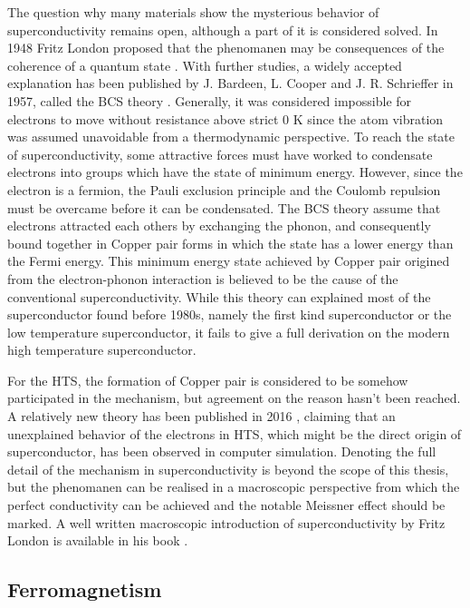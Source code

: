 The question why many materials show the mysterious behavior of superconductivity remains open, although a part of it is considered solved.
In 1948 Fritz London proposed that the phenomanen may be consequences of the coherence of a quantum state \cite{2_10}.
With further studies, a widely accepted explanation has been published by J. Bardeen, L. Cooper and J. R. Schrieffer in 1957, called the BCS theory \cite{2_11}.
Generally, it was considered impossible for electrons to move without resistance above strict 0 K since the atom vibration was assumed unavoidable from a thermodynamic perspective.
To reach the state of superconductivity, some attractive forces must have worked to condensate electrons into groups which have the state of minimum energy.
However, since the electron is a fermion, the Pauli exclusion principle and the Coulomb repulsion must be overcame before it can be condensated.
The BCS theory assume that electrons attracted each others by exchanging the phonon, and consequently bound together in Copper pair forms in which the state has a lower energy than the Fermi energy.
This minimum energy state achieved by Copper pair origined from the electron-phonon interaction is believed to be the cause of the conventional superconductivity.
While this theory can explained most of the superconductor found before 1980s, namely the first kind superconductor or the low temperature superconductor,
it fails to give a full derivation on the modern high temperature superconductor.

For the HTS, the formation of Copper pair is considered to be somehow participated in the mechanism, but agreement on the reason hasn't been reached.
A relatively new theory has been published in 2016 \cite{2_12}, claiming that an unexplained behavior of the electrons in HTS,
which might be the direct origin of superconductor, has been observed in computer simulation.
Denoting the full detail of the mechanism in superconductivity is beyond the scope of this thesis,
but the phenomanen can be realised in a macroscopic perspective from which the perfect conductivity can be achieved and the notable Meissner effect should be marked.
A well written macroscopic introduction of superconductivity by Fritz London is available in his book \cite{2_10}.


\newpage
\subsection{Ferromagnetism}
